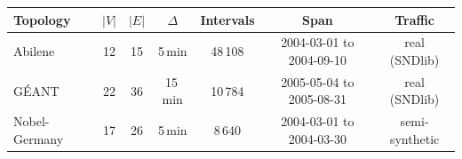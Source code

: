 \begin{tabular}{@{}lcccccc@{}}
\toprule
Topology & $|V|$ & $|E|$ & $\Delta$ & Intervals & Span & Traffic \\
\midrule
Abilene & 12 & 15 & 5\,min & 48\,108 & 2004-03-01 to 2004-09-10 & real (SNDlib) \\
G\'{E}ANT & 22 & 36 & 15\,min & 10\,784 & 2005-05-04 to 2005-08-31 & real (SNDlib) \\
Nobel-Germany & 17 & 26 & 5\,min & 8\,640 & 2004-03-01 to 2004-03-30 & semi-synthetic \\
\bottomrule
\end{tabular}
